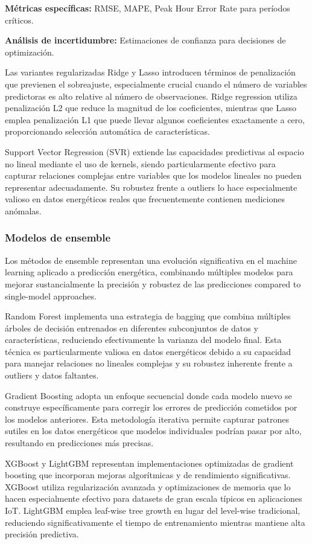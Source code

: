 \textbf{Métricas específicas:} RMSE, MAPE, Peak Hour Error Rate para períodos críticos.

\textbf{Análisis de incertidumbre:} Estimaciones de confianza para decisiones de optimización.

Las variantes regularizadas Ridge y Lasso introducen términos de penalización que previenen el sobreajuste, especialmente crucial cuando el número de variables predictoras es alto relative al número de observaciones. Ridge regression utiliza penalización L2 que reduce la magnitud de los coeficientes, mientras que Lasso emplea penalización L1 que puede llevar algunos coeficientes exactamente a cero, proporcionando selección automática de características.

Support Vector Regression (SVR) extiende las capacidades predictivas al espacio no lineal mediante el uso de kernels, siendo particularmente efectivo para capturar relaciones complejas entre variables que los modelos lineales no pueden representar adecuadamente. Su robustez frente a outliers lo hace especialmente valioso en datos energéticos reales que frecuentemente contienen mediciones anómalas.

\subsubsection{Modelos de ensemble}

Los métodos de ensemble representan una evolución significativa en el machine learning aplicado a predicción energética, combinando múltiples modelos para mejorar sustancialmente la precisión y robustez de las predicciones compared to single-model approaches.

Random Forest implementa una estrategia de bagging que combina múltiples árboles de decisión entrenados en diferentes subconjuntos de datos y características, reduciendo efectivamente la varianza del modelo final. Esta técnica es particularmente valiosa en datos energéticos debido a su capacidad para manejar relaciones no lineales complejas y su robustez inherente frente a outliers y datos faltantes.

Gradient Boosting adopta un enfoque secuencial donde cada modelo nuevo se construye específicamente para corregir los errores de predicción cometidos por los modelos anteriores. Esta metodología iterativa permite capturar patrones sutiles en los datos energéticos que modelos individuales podrían pasar por alto, resultando en predicciones más precisas.

XGBoost y LightGBM representan implementaciones optimizadas de gradient boosting que incorporan mejoras algorítmicas y de rendimiento significativas. XGBoost utiliza regularización avanzada y optimizaciones de memoria que lo hacen especialmente efectivo para datasets de gran escala típicos en aplicaciones IoT. LightGBM emplea leaf-wise tree growth en lugar del level-wise tradicional, reduciendo significativamente el tiempo de entrenamiento mientras mantiene alta precisión predictiva.

